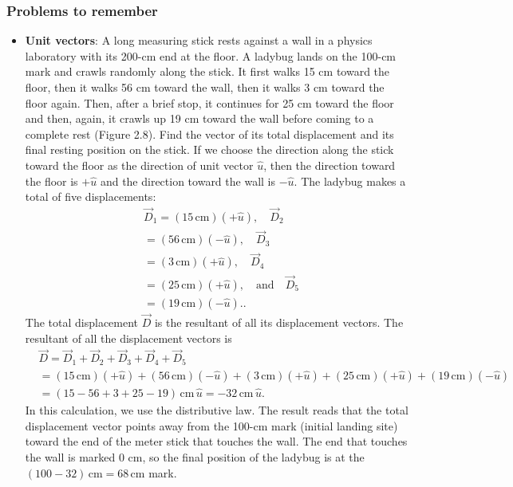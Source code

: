 \documentclass{report}
\begin{document}
    \pagebreak 
    \subsubsection{Problems to remember}
    \begin{itemize}
        \item \textbf{Unit vectors}: A long measuring stick rests against a wall in a physics laboratory with its 200-cm end at the floor. A ladybug lands on the 100-cm mark and crawls randomly along the stick. It first walks 15 cm toward the floor, then it walks 56 cm toward the wall, then it walks 3 cm toward the floor again. Then, after a brief stop, it continues for 25 cm toward the floor and then, again, it crawls up 19 cm toward the wall before coming to a complete rest (Figure 2.8). Find the vector of its total displacement and its final resting position on the stick.
        \bigbreak \noindent 
        If we choose the direction along the stick toward the floor as the direction of unit vector $\hat{u}$, then the direction toward the floor is $+\hat{u}$ and the direction toward the wall is $-\hat{u}$. The ladybug makes a total of five displacements:
    \begin{align*}
        &\vec{D}_1 = (15\,\text{cm})(+\hat{u}), \quad \vec{D}_2  \\
        &= (56\,\text{cm})(-\hat{u}), \quad \vec{D}_3  \\
        &= (3\,\text{cm})(+\hat{u}), \quad \vec{D}_4  \\
        &= (25\,\text{cm})(+\hat{u}), \quad \text{and} \quad \vec{D}_5  \\
        &= (19\,\text{cm})(-\hat{u}).
    .\end{align*}
    The total displacement $\vec{D}$ is the resultant of all its displacement vectors.
    \bigbreak \noindent 
    The resultant of all the displacement vectors is
    \begin{align*}
        &\vec{D} = \vec{D}_1 + \vec{D}_2 + \vec{D}_3 + \vec{D}_4 + \vec{D}_5  \\
        &= (15\,\text{cm})(+\hat{u}) + (56\,\text{cm})(-\hat{u}) + (3\,\text{cm})(+\hat{u}) + (25\,\text{cm})(+\hat{u}) + (19\,\text{cm})(-\hat{u})  \\
        &= (15 - 56 + 3 + 25 - 19)\,\text{cm}\,\hat{u} = -32\,\text{cm}\,\hat{u}
    .\end{align*}
    In this calculation, we use the distributive law. The result reads that the total displacement vector points away from the 100-cm mark (initial landing site) toward the end of the meter stick that touches the wall. The end that touches the wall is marked 0 cm, so the final position of the ladybug is at the $(100 - 32)\,\text{cm} = 68\,\text{cm}$ mark.
    \end{itemize}
\end{document}

